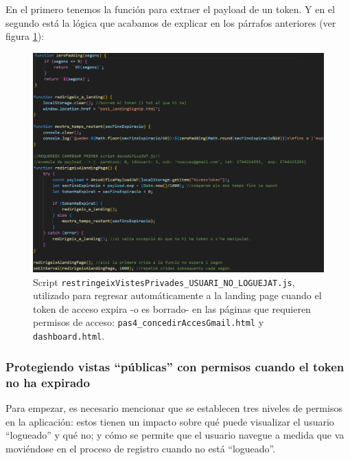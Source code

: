 \documentclass[a4paper,12pt]{report}
\begin{document}
	En el primero tenemos la función para extraer el payload de un token. Y en el segundo está la lógica que acabamos de explicar en los párrafos anteriores (ver figura \ref{fig:restringeixVistesPrivades_USUARI_NO_LOGUEJAT}):
	
	
	\setlength{\belowcaptionskip}{3pt}
	\FloatBarrier
	\begin{figure}[H]
		\centering
		\caption{Script \texttt{restringeixVistesPrivades\_USUARI\_NO\_LOGUEJAT.js}, utilizado para regresar automáticamente a la landing page cuando el token de acceso expira -o es borrado- en las páginas que requieren permisos de acceso: \texttt{pas4\_concedirAccesGmail.html} y \texttt{dashboard.html}.}
		\includegraphics[width=1\linewidth]{img/restringeixVistesPrivades_USUARI_NO_LOGUEJAT.png}

		\label{fig:restringeixVistesPrivades_USUARI_NO_LOGUEJAT}
	\end{figure}
	\FloatBarrier
	
	\subsubsection{Protegiendo vistas ``públicas'' con permisos cuando el token no ha expirado}
	\label{sec:vistasPermisos}
	

	
	Para empezar, es necesario mencionar que se establecen tres niveles de permisos en la aplicación: estos  tienen un impacto sobre qué puede visualizar el usuario ``logueado'' y qué no; y cómo se permite que el usuario navegue a medida que va moviéndose en el proceso de registro cuando no está ``logueado''.
	
\end{document}
